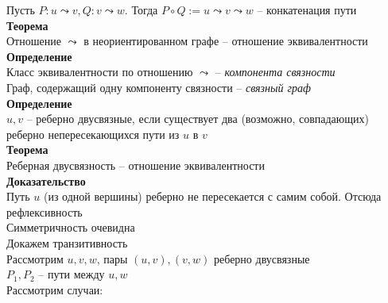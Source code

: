 \documentclass[12pt]{article}
\begin{document}
Пусть $P: u\leadsto v, Q: v\leadsto w$. Тогда $P\circ Q:=u\leadsto v \leadsto w$ -- конкатенация пути\\
\textbf{Теорема}\\
Отношение $\leadsto$ в неориентированном графе -- отношение эквивалентности\\
\textbf{Определение}\\
Класс эквивалентности по отношению $\leadsto$ -- \textit{компонента связности}\\
Граф, содержащий одну компоненту связности -- \textit{связный граф}\\
\textbf{Определение}\\
$u, v$ -- реберно двусвязные, если существует два (возможно, совпадающих) реберно непересекающихся пути из $u$ в $v$\\
\textbf{Теорема}\\
Реберная двусвязность -- отношение эквивалентности\\
\textbf{Доказательство}\\
Путь $u$ (из одной вершины) реберно не пересекается с самим собой. Отсюда рефлексивность\\
Симметричность очевидна\\
Докажем транзитивность\\
Рассмотрим $u, v, w$, пары $(u, v), (v, w)$ реберно двусвязные\\
$P_1, P_2$ -- пути между $u,w$\\
Рассмотрим случаи:
\end{document}
